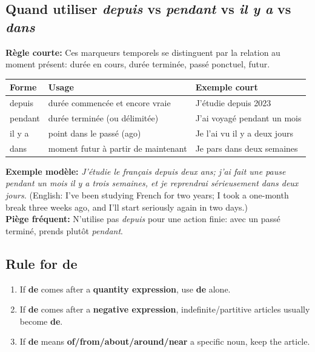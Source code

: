 \documentclass{article}
\begin{document}
\subsection{Quand utiliser \textit{depuis} vs \textit{pendant} vs \textit{il y a} vs \textit{dans}}
\textbf{Règle courte:} Ces marqueurs temporels se distinguent par la relation au moment présent: durée en cours, durée terminée, passé ponctuel, futur.
\begin{center}
    \begin{tabular}{|l|l|l|}
        \hline
        \textbf{Forme} & \textbf{Usage} & \textbf{Exemple court} \\
        \hline
        depuis & durée commencée et encore vraie & J'étudie depuis 2023 \\
        \hline
        pendant & durée terminée (ou délimitée) & J'ai voyagé pendant un mois \\
        \hline
        il y a & point dans le passé (ago) & Je l'ai vu il y a deux jours \\
        \hline
        dans & moment futur à partir de maintenant & Je pars dans deux semaines \\
        \hline
    \end{tabular}
\end{center}
\textbf{Exemple modèle:} \textit{J'étudie le français depuis deux ans; j'ai fait une pause pendant un mois il y a trois semaines, et je reprendrai sérieusement dans deux jours.} (English: I've been studying French for two years; I took a one-month break three weeks ago, and I'll start seriously again in two days.) \\
\textbf{Piège fréquent:} N'utilise pas \textit{depuis} pour une action finie: avec un passé terminé, prends plutôt \textit{pendant}.

\subsection{Rule for de}

\begin{enumerate}
    \item If \textbf{de} comes after a \textbf{quantity expression}, use \textbf{de} alone.
    \item If \textbf{de} comes after a \textbf{negative expression}, indefinite/partitive articles usually become \textbf{de}.
    \item If \textbf{de} means \textbf{of/from/about/around/near} a specific noun, keep the article.
\end{enumerate}
\end{document}
